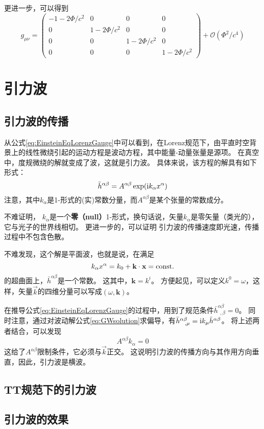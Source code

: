 更进一步，可以得到
\begin{equation}\label{eq:NewtonianMetric}
  g_{\mu\nu} ={\begin{pmatrix}
    -1-2\Phi/c^2 & 0 & 0 & 0\\
    0 & 1-2\Phi/c^2 & 0 & 0\\ 
    0 & 0 & 1-2\Phi/c^2 & 0\\
    0 & 0 & 0 & 1-2\Phi/c^2\end{pmatrix}} + \mathcal{O}(\Phi^2/c^4)
\end{equation}


\section{引力波}
\subsection{引力波的传播}
从公式\ref{eq:EinsteinEqLorenzGauge}中可以看到，在Lorenz规范下，由平直时空背景上的线性微绕引起的运动方程是波动方程，其中能量-动量张量是源项。
在真空中，度规微绕的解就变成了波，这就是引力波。
具体来说，该方程的解具有如下形式：
\begin{equation}\label{eq:GWsolution} 
  \bar{h}^{\alpha\beta} =  A^{\alpha\beta} \exp({\rm i} k_\alpha x^\alpha)
\end{equation}
注意，其中${k_\alpha}$是1-形式的(实)常数分量，而$A^{\alpha\beta}$是某个张量的常数成分。

不难证明，%
$k_\alpha$是一个{\textbf{零（null）}}1-形式，换句话说，矢量$k_\alpha$是零矢量（类光的），它与光子的世界线相切。
更进一步的，可以证明%
引力波的传播速度即光速，传播过程中不包含色散。%

不难发现，这个解是平面波，也就是说，在满足
\begin{equation}\label{eq:PlaneWave} 
  k_\alpha x^\alpha = k_0+\textbf{k}\cdot\textbf{x} =  {\rm const.}
\end{equation}
的超曲面上，$\bar{h}^{\alpha\beta} $是一个常数。
这其中，$\textbf{k}={k^i}$。
方便起见，可以定义$k^0=\omega$，这样，矢量$\vec{k}$的四维分量可以写成$(\omega,\textbf{k})$。

在推导公式\ref{eq:EinsteinEqLorenzGauge}的过程中，用到了规范条件$\bar{h}^{\alpha\beta}_{~~,\beta} = 0$。
同时注意，通过对波动解公式\ref{eq:GWsolution}求偏导，有$\bar{h}^{\alpha\beta}_{~~ ,\mu} = {\rm i}k_\mu \bar{h}^{\alpha\beta}$。
将上述两者结合，可以发现
\begin{equation}\label{eq:Transverse} 
  A^{\alpha\beta} k_\alpha  = 0
\end{equation}
这给了$A^{\alpha\beta} $限制条件，它必须与$\vec{k}$正交。
这说明引力波的传播方向与其作用方向垂直，因此，引力波是横波。

\subsection{TT规范下的引力波}



\subsection{引力波的效果}
